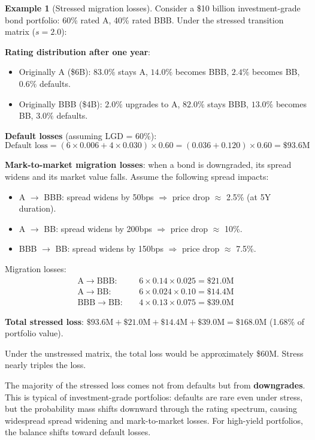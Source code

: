 \documentclass[11pt, a4paper]{article}
\theoremstyle{definition}
\newtheorem{example}{Example}[section]
\theoremstyle{plain}
\theoremstyle{remark}
\begin{document}
\begin{example}[Stressed migration losses]\label{ex:stressed-migration}
Consider a \$10 billion investment-grade bond portfolio:
60\% rated A, 40\% rated BBB.
Under the stressed transition matrix ($s = 2.0$):

\textbf{Rating distribution after one year}:
\begin{itemize}
    \item Originally A (\$6B):
    $83.0\%$ stays A, $14.0\%$ becomes BBB, $2.4\%$ becomes BB, $0.6\%$ defaults.
    \item Originally BBB (\$4B):
    $2.0\%$ upgrades to A, $82.0\%$ stays BBB, $13.0\%$ becomes BB, $3.0\%$ defaults.
\end{itemize}

\textbf{Default losses} (assuming LGD = 60\%):
\[
    \text{Default loss} = (6 \times 0.006 + 4 \times 0.030) \times 0.60 = (0.036 + 0.120) \times 0.60 = \$93.6\text{M}
\]

\textbf{Mark-to-market migration losses}:
when a bond is downgraded, its spread widens and its market value falls.
Assume the following spread impacts:
\begin{itemize}
    \item A $\to$ BBB: spread widens by 50bps $\Rightarrow$ price drop $\approx$ 2.5\% (at 5Y duration).
    \item A $\to$ BB: spread widens by 200bps $\Rightarrow$ price drop $\approx$ 10\%.
    \item BBB $\to$ BB: spread widens by 150bps $\Rightarrow$ price drop $\approx$ 7.5\%.
\end{itemize}

Migration losses:
\begin{align*}
    \text{A} \to \text{BBB}: &\quad 6 \times 0.14 \times 0.025 = \$21.0\text{M} \\
    \text{A} \to \text{BB}: &\quad 6 \times 0.024 \times 0.10 = \$14.4\text{M} \\
    \text{BBB} \to \text{BB}: &\quad 4 \times 0.13 \times 0.075 = \$39.0\text{M}
\end{align*}

\textbf{Total stressed loss}: $\$93.6\text{M} + \$21.0\text{M} + \$14.4\text{M} + \$39.0\text{M} = \$168.0\text{M}$
(1.68\% of portfolio value).

Under the unstressed matrix, the total loss would be approximately \$60M.
Stress nearly triples the loss.
\end{example}

\begin{interpbox}
The majority of the stressed loss comes not from defaults but from \textbf{downgrades}.
This is typical of investment-grade portfolios: defaults are rare even under stress,
but the probability mass shifts downward through the rating spectrum,
causing widespread spread widening and mark-to-market losses.
For high-yield portfolios, the balance shifts toward default losses.
\end{interpbox}
\end{document}
